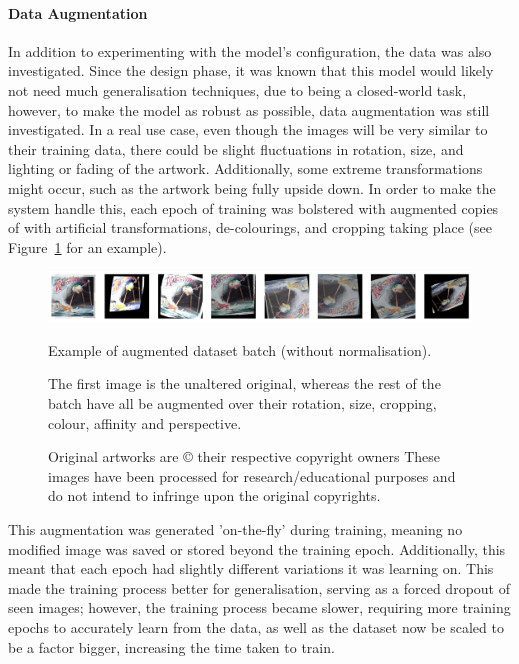                     \paragraph{Data Augmentation}
        
                        In addition to experimenting with the model's configuration, the data was also investigated. Since the design phase, it was known that this model would likely not need much generalisation techniques, due to being a closed-world task, however, to make the model as robust as possible, data augmentation was still investigated. In a real use case, even though the images will be very similar to their training data, there could be slight fluctuations in rotation, size, and lighting or fading of the artwork. Additionally, some extreme transformations might occur, such as the artwork being fully upside down. In order to make the system handle this, each epoch of training was bolstered with augmented copies of with artificial transformations, de-colourings, and cropping taking place (see Figure~\ref{fig:augmentedArts} for an example).
    
                        \begin{figure}[h]
                            \centering
                            \includegraphics[width=\textwidth]{images/AugmentedArts.png}
                            \caption{Example of augmented dataset batch (without normalisation).}
                            \label{fig:augmentedArts}
                            \caption*{
                                The first image is the unaltered original, whereas the rest of the batch have all be augmented over their rotation, size, cropping, colour, affinity and perspective.
                            }
                            \caption*{
                                Original artworks are © their respective copyright owners
                                \footnotesize These images have been processed for research/educational purposes and do not intend to infringe upon the original copyrights.
                            }
                        \end{figure}
    
                        This augmentation was generated 'on-the-fly' during training, meaning no modified image was saved or stored beyond the training epoch. Additionally, this meant that each epoch had slightly different variations it was learning on. This made the training process better for generalisation, serving as a forced dropout of seen images; however, the training process became slower, requiring more training epochs to accurately learn from the data, as well as the dataset now be scaled to be a factor bigger, increasing the time taken to train.
    
